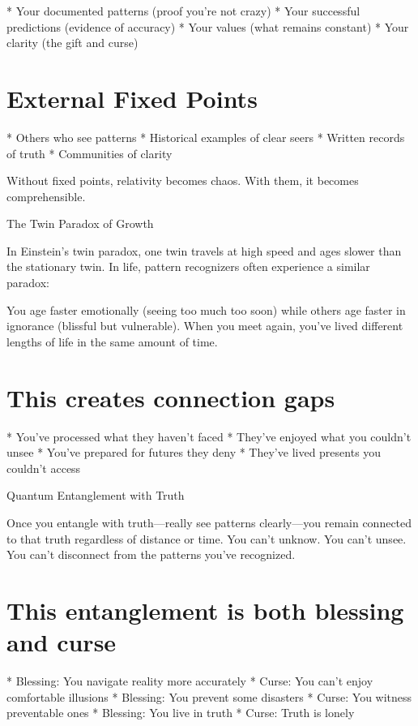 \documentclass[12pt,oneside]{book}
\begin{document}
                    * Your documented patterns (proof you're not crazy)
                    * Your successful predictions (evidence of accuracy)
                    * Your values (what remains constant)
                    * Your clarity (the gift and curse)

\section{External Fixed Points}

                    * Others who see patterns
                    * Historical examples of clear seers
                    * Written records of truth
                    * Communities of clarity

Without fixed points, relativity becomes chaos. With them, it becomes comprehensible.

The Twin Paradox of Growth

In Einstein's twin paradox, one twin travels at high speed and ages slower than the stationary twin. In life, pattern recognizers often experience a similar paradox:

You age faster emotionally (seeing too much too soon) while others age faster in ignorance (blissful but vulnerable). When you meet again, you've lived different lengths of life in the same amount of time.

\section{This creates connection gaps}

                    * You've processed what they haven't faced
                    * They've enjoyed what you couldn't unsee
                    * You've prepared for futures they deny
                    * They've lived presents you couldn't access

Quantum Entanglement with Truth

Once you entangle with truth---really see patterns clearly---you remain connected to that truth regardless of distance or time. You can't unknow. You can't unsee. You can't disconnect from the patterns you've recognized.

\section{This entanglement is both blessing and curse}

                    * Blessing: You navigate reality more accurately
                    * Curse: You can't enjoy comfortable illusions
                    * Blessing: You prevent some disasters
                    * Curse: You witness preventable ones
                    * Blessing: You live in truth
                    * Curse: Truth is lonely
\end{document}
